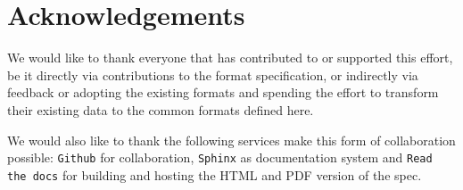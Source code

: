 \section{Acknowledgements}

We would like to thank everyone that has contributed to or supported this
effort, be it directly via contributions to the format specification, or
indirectly via feedback or adopting the existing formats and spending the
effort to transform their existing data to the common formats defined here.

We would also like to thank the following services make this form of
collaboration possible: \texttt{Github} for collaboration, \texttt{Sphinx} as
documentation system and \texttt{Read the docs} for building and hosting the
HTML and PDF version of the spec.
